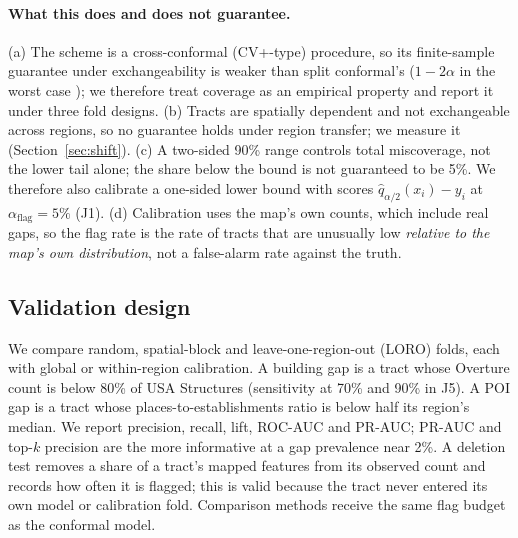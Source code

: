 \documentclass[11pt]{article}
\begin{document}
\paragraph{What this does and does not guarantee.} (a) The scheme is a cross-conformal (CV+-type) procedure, so its finite-sample guarantee under exchangeability is weaker than split conformal's ($1-2\alpha$ in the worst case \citep{barber2021}); we therefore treat coverage as an empirical property and report it under three fold designs. (b) Tracts are spatially dependent and not exchangeable across regions, so no guarantee holds under region transfer; we measure it (Section~\ref{sec:shift}). (c) A two-sided 90\% range controls total miscoverage, not the lower tail alone; the share below the bound is not guaranteed to be 5\%. We therefore also calibrate a one-sided lower bound with scores $\hat q_{\alpha/2}(x_i)-y_i$ at $\alpha_{\mathrm{flag}}=5\%$ (J1). (d) Calibration uses the map's own counts, which include real gaps, so the flag rate is the rate of tracts that are unusually low \emph{relative to the map's own distribution}, not a false-alarm rate against the truth.

\subsection{Validation design}
We compare random, spatial-block and leave-one-region-out (LORO) folds, each with global or within-region calibration. A building gap is a tract whose Overture count is below 80\% of USA Structures (sensitivity at 70\% and 90\% in J5). A POI gap is a tract whose places-to-establishments ratio is below half its region's median. We report precision, recall, lift, ROC-AUC and PR-AUC; PR-AUC and top-$k$ precision are the more informative at a gap prevalence near 2\%. A deletion test removes a share of a tract's mapped features from its observed count and records how often it is flagged; this is valid because the tract never entered its own model or calibration fold. Comparison methods receive the same flag budget as the conformal model.
\end{document}
